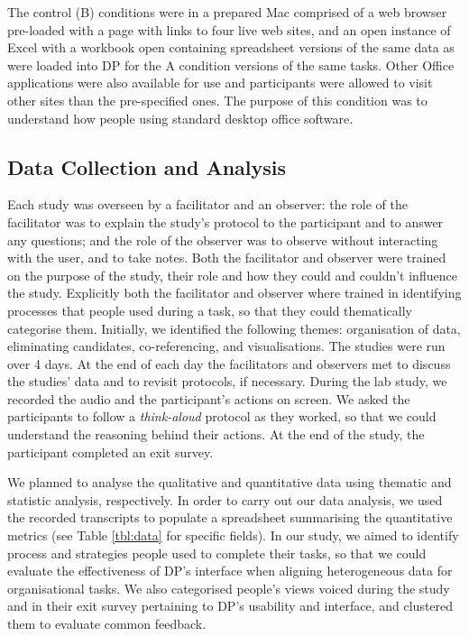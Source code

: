 \documentclass{sigchi}
\begin{document}
The control (B) conditions were in a prepared Mac comprised of a web browser pre-loaded with a page with links to four live web sites, and an open instance of Excel with a workbook open containing spreadsheet versions of the same data as were loaded into DP for the A condition versions of the same tasks.  Other Office applications were also available for use and participants were allowed to visit other sites than the pre-specified ones.  The purpose of this condition was to understand how people using standard desktop office software.

\subsection{Data Collection and Analysis}
Each study was overseen by a facilitator and an observer:  the role of the facilitator was to explain the study's protocol to the participant and to answer any questions; and the role of the observer was to observe without interacting with the user, and to take notes.  Both the facilitator and observer were trained on the purpose of the study, their role and how they could and couldn't influence the study.   Explicitly both the facilitator and observer where trained in identifying processes that people used during a task, so that they could thematically categorise them.  Initially, we identified the following themes: organisation of data, eliminating candidates, co-referencing, and visualisations. The studies were run over 4 days.  At the end of each day the facilitators and observers met to discuss the studies' data and to revisit protocols, if necessary.  During the lab study, we recorded the audio and the participant's actions on screen. We asked the participants to follow a \emph{think-aloud} protocol as they worked, so that we could understand the reasoning behind their actions.  At the end of the study, the participant completed an exit survey.

We planned to analyse the qualitative and quantitative data using thematic and statistic analysis, respectively.  In order to carry out our data analysis, we used the recorded transcripts to populate a spreadsheet summarising the quantitative metrics (see Table \ref{tbl:data} for specific fields).  In our study, we aimed to identify process and strategies people used to complete their tasks, so that we could evaluate the effectiveness of DP's interface when aligning heterogeneous data for organisational tasks.  We also categorised people's views voiced during the study and in their exit survey pertaining to DP's usability and interface, and clustered them to evaluate common feedback.
\end{document}

